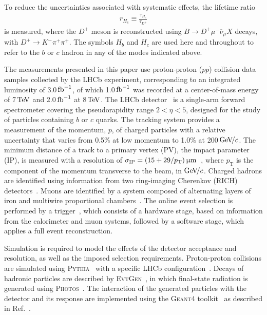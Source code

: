 \documentclass[12pt,a4paper]{article}
\def\lhcb   {\mbox{LHCb}\xspace}
\def\Pmu         {\ensuremath{\upmu}\xspace}
\def\Pnu         {\ensuremath{\upnu}\xspace}
\def\Ppi         {\ensuremath{\uppi}\xspace}
\def\PD      {\ensuremath{\mathrm{D}}\xspace}
\def\PK      {\ensuremath{\mathrm{K}}\xspace}
\def\Pb      {\ensuremath{\mathrm{b}}\xspace}
\def\Pc      {\ensuremath{\mathrm{c}}\xspace}
\def\Pmu         {\ensuremath{\mu}\xspace}
\def\Pnu         {\ensuremath{\nu}\xspace}
\def\Ppi         {\ensuremath{\pi}\xspace}
\def\PD      {\ensuremath{D}\xspace}
\def\PK      {\ensuremath{K}\xspace}
\def\Pb      {\ensuremath{b}\xspace}
\def\Pc      {\ensuremath{c}\xspace}
\def\mun        {{\ensuremath{\Pmu^-}}\xspace} \def\mupm       {{\ensuremath{\Pmu^\pm}}\xspace}
\def\neub       {{\ensuremath{\overline{\Pnu}}}\xspace}
\def\neumb      {{\ensuremath{\neub_\mu}}\xspace}
\def\cquark    {{\ensuremath{\Pc}}\xspace}
\def\bquark    {{\ensuremath{\Pb}}\xspace}
\def\pion   {{\ensuremath{\Ppi}}\xspace}
\def\pip    {{\ensuremath{\pion^+}}\xspace}
\def\kaon    {{\ensuremath{\PK}}\xspace}
\def\Km      {{\ensuremath{\kaon^-}}\xspace}
\def\D       {{\ensuremath{\PD}}\xspace}
\def\Dp      {{\ensuremath{\D^+}}\xspace}
\def\to                 {\ensuremath{\rightarrow}\xspace}
\newcommand{\nospaceunit}[1]{\ensuremath{\text{#1}}}
\newcommand{\aunit}[1]{\ensuremath{\text{\,#1}}}
\newcommand{\tev}{\aunit{Te\kern -0.1em V}\xspace}
\newcommand{\gevc}{\ensuremath{\aunit{Ge\kern -0.1em V\!/}c}\xspace}
\def\mum  {\ensuremath{\,\upmu\nospaceunit{m}}\xspace}
\def\fb   {\ensuremath{\aunit{fb}}\xspace}
\def\invfb   {\ensuremath{\fb^{-1}}\xspace}
\def\pt         {\ensuremath{p_{\mathrm{T}}}\xspace}
\def\ptot       {\ensuremath{p}\xspace}
\def\evtgen     {\mbox{\textsc{EvtGen}}\xspace}
\def\geant      {\mbox{\textsc{Geant4}}\xspace}
\def\photos     {\mbox{\textsc{Photos}}\xspace}
\def\pythia     {\mbox{\textsc{Pythia}}\xspace}
\begin{document}
To reduce the uncertainties associated with systematic effects, the lifetime ratio
\begin{align}
r_{H_c}\equiv\frac{\tau_{H_c}}{\tau_{\Dp}}
\label{eq:rtau}
\end{align}
\noindent is measured, where the $\Dp$ meson is reconstructed using $B\to\Dp\mun\neumb X$ decays, with \mbox{$\Dp\to\Km\pip\pip$}. 
The symbols $H_b$ and $H_c$ are used here and throughout to refer to the $b$ or $c$ hadron in any of the 
modes indicated above.

The measurements presented in this paper use proton-proton ($pp$) collision data samples collected by the LHCb experiment,
corresponding to an integrated luminosity of 3.0\invfb, of which 1.0\invfb was recorded at 
a center-of-mass energy of 7\tev and 2.0\invfb at 8\tev.
The \lhcb detector~\cite{Alves:2008zz,LHCb-DP-2014-002} is a single-arm forward
spectrometer covering the \mbox{pseudorapidity} range $2<\eta <5$,
designed for the study of particles containing \bquark or \cquark
quarks. The tracking system provides a measurement of the momentum, \ptot, of charged particles with
a relative uncertainty that varies from 0.5\% at low momentum to 1.0\% at 200\gevc.
The minimum distance of a track to a primary vertex (PV), the impact parameter (IP), 
is measured with a resolution of $\sigma_{\rm IP}=(15+29/\pt)\mum$~\cite{LHCb-DP-2014-001},
where \pt is the component of the momentum transverse to the beam, in\,\gevc.
Charged hadrons are identified using information
from two ring-imaging Cherenkov (RICH) detectors~\cite{LHCb-DP-2012-003}.
Muons are identified by a
system composed of alternating layers of iron and multiwire
proportional chambers~\cite{LHCb-DP-2013-001}. The online event selection is performed by a trigger~\cite{LHCb-DP-2012-004}, 
which consists of a hardware stage, based on information from the calorimeter and muon
systems, followed by a software stage, which applies a full event reconstruction.

Simulation is required to model the effects of the detector acceptance and resolution,
as well as the imposed selection requirements. Proton-proton collisions are simulated using
\pythia~\cite{Sjostrand:2006za,*Sjostrand:2007gs} with a specific \lhcb
configuration~\cite{LHCb-PROC-2010-056}.  Decays of hadronic particles
are described by \evtgen~\cite{Lange:2001uf}, in which final-state
radiation is generated using \photos~\cite{Golonka:2005pn}. The
interaction of the generated particles with the detector and its
response are implemented using the \geant toolkit~\cite{Allison:2006ve, *Agostinelli:2002hh} as described in
Ref.~\cite{LHCb-PROC-2011-006}. 
\end{document}

